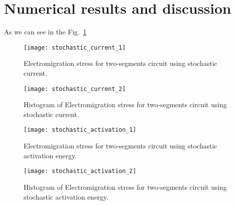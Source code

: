 \section{Numerical results and discussion}
  \label{sec:results}
As we can see in the Fig.~\ref{fig:stochastic_current_1}
\begin{figure}[h]
  \centering
  \texttt{[image: stochastic\_current\_1]}
  \caption{Electromigration stress for two-segments circuit using stochastic current.}
\label{fig:stochastic_current_1}
\end{figure}

\begin{figure}[h]
  \centering
  \texttt{[image: stochastic\_current\_2]}
  \caption{Histogram of Electromigration stress for two-segments circuit using stochastic current.}
\label{fig:stochastic_current_2}
\end{figure}

\begin{figure}[h]
  \centering
  \texttt{[image: stochastic\_activation\_1]}
  \caption{Electromigration stress for two-segments circuit using stochastic activation energy.}
\label{fig:stochastic_activation_1}
\end{figure}

\begin{figure}[h]
  \centering
  \texttt{[image: stochastic\_activation\_2]}
  \caption{Histogram of Electromigration stress for two-segments circuit using stochastic activation energy.}
\label{fig:stochastic_activation_2}
\end{figure}
